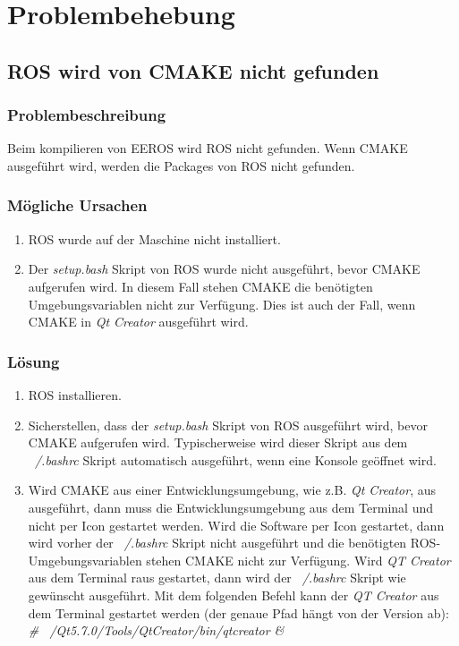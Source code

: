 \chapter{Problembehebung}


\section{ROS wird von CMAKE nicht gefunden}
\subsection{Problembeschreibung}
Beim kompilieren von EEROS wird ROS nicht gefunden.
Wenn CMAKE ausgeführt wird, werden die Packages von ROS nicht gefunden.

\subsection{Mögliche Ursachen}
\begin{enumerate}
\item ROS wurde auf der Maschine nicht installiert.
\item Der \textit{setup.bash} Skript von ROS wurde nicht ausgeführt, bevor CMAKE aufgerufen wird.
In diesem Fall stehen CMAKE die benötigten Umgebungsvariablen nicht zur Verfügung.
Dies ist auch der Fall, wenn CMAKE in \textit{Qt Creator} ausgeführt wird.
\end{enumerate}

\subsection{Lösung}
\begin{enumerate}
\item ROS installieren.
\item Sicherstellen, dass der \textit{setup.bash} Skript von ROS ausgeführt wird, bevor CMAKE aufgerufen wird.
Typischerweise wird dieser Skript aus dem \textit{~/.bashrc} Skript automatisch ausgeführt, wenn eine Konsole geöffnet wird.
\item Wird CMAKE aus einer Entwicklungsumgebung, wie z.B. \textit{Qt Creator}, aus ausgeführt, dann muss die Entwicklungsumgebung aus dem Terminal und nicht per Icon gestartet werden.
Wird die Software per Icon gestartet, dann wird vorher der \textit{~/.bashrc} Skript nicht ausgeführt und die benötigten ROS-Umgebungsvariablen stehen CMAKE nicht zur Verfügung.
Wird \textit{QT Creator} aus dem Terminal raus gestartet, dann wird der \textit{~/.bashrc} Skript wie gewünscht ausgeführt.
Mit dem folgenden Befehl kann der \textit{QT Creator} aus dem Terminal gestartet werden (der genaue Pfad hängt von der Version ab):\\
\textit{\# ~/Qt5.7.0/Tools/QtCreator/bin/qtcreator \&}
\end{enumerate}


